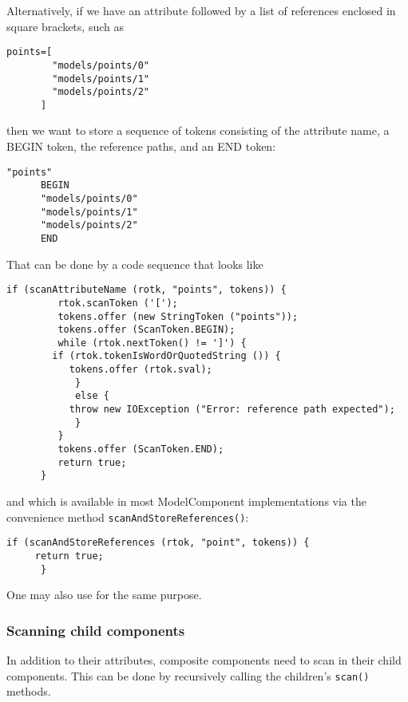 \documentclass{article}
\begin{document}
Alternatively, if we have an attribute followed by 
a list of references enclosed in square brackets, such as
\begin{lstlisting}[]
      points=[
        "models/points/0"
        "models/points/1"
        "models/points/2"
      ]
\end{lstlisting}
then we want to store a sequence of tokens consisting of the
attribute name, a BEGIN token, the reference paths, and an END token:
\begin{lstlisting}[]
      "points"
      BEGIN
      "models/points/0"
      "models/points/1"
      "models/points/2"
      END
\end{lstlisting}
That can be done by a code sequence that looks like
\begin{lstlisting}[]
      if (scanAttributeName (rotk, "points", tokens)) {
         rtok.scanToken ('[');
         tokens.offer (new StringToken ("points"));
         tokens.offer (ScanToken.BEGIN);
         while (rtok.nextToken() != ']') {
	    if (rtok.tokenIsWordOrQuotedString ()) {
	       tokens.offer (rtok.sval);
            }
            else {
	       throw new IOException ("Error: reference path expected");
            }
         }
         tokens.offer (ScanToken.END);
         return true;
      }
\end{lstlisting}
and which is available in most ModelComponent implementations
via the convenience method {\tt scanAndStoreReferences()}:
\begin{lstlisting}[]
      if (scanAndStoreReferences (rtok, "point", tokens)) {
	 return true;
      }
\end{lstlisting}
One may also use
for the same purpose.

\subsubsection{Scanning child components}

In addition to their attributes, composite components need to scan in
their child components. This can be done by recursively calling the
children's {\tt scan()} methods.
\end{document}
